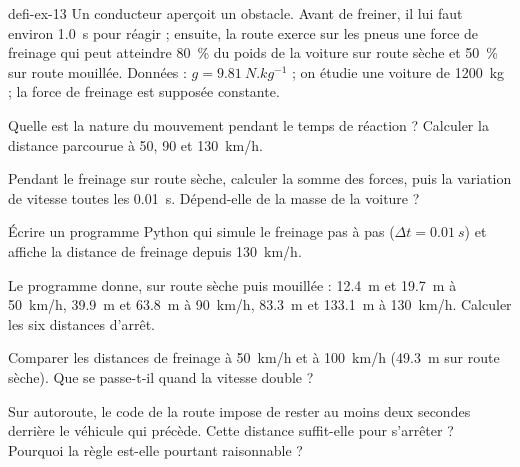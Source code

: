 \begin{blocEdition}{defi-ex-13}
Un conducteur aperçoit un obstacle. Avant de freiner, il lui faut environ \qty{1,0}{s} pour réagir ; ensuite, la route exerce sur les
pneus une force de freinage qui peut atteindre \qty{80}{\percent} du poids de la voiture sur route sèche et \qty{50}{\percent} sur route mouillée.
Données : $g=\qty{9,81}{N.kg^{-1}}$ ; on étudie une voiture de \qty{1200}{kg} ; la force de freinage est supposée constante.
\begin{questions}
\item Quelle est la nature du mouvement pendant le temps de réaction ? Calculer la distance parcourue à 50, 90 et \qty{130}{km/h}.
\item Pendant le freinage sur route sèche, calculer la somme des forces, puis la variation de vitesse toutes les \qty{0,01}{s}. Dépend-elle
de la masse de la voiture ?
\item Écrire un programme Python qui simule le freinage pas à pas ($\Delta t=\qty{0,01}{s}$) et affiche la distance de freinage depuis \qty{130}{km/h}.
\item Le programme donne, sur route sèche puis mouillée : \qty{12,4}{m} et \qty{19,7}{m} à \qty{50}{km/h}, \qty{39,9}{m} et \qty{63,8}{m} à \qty{90}{km/h},
\qty{83,3}{m} et \qty{133,1}{m} à \qty{130}{km/h}. Calculer les six distances d'arrêt.
\item Comparer les distances de freinage à \qty{50}{km/h} et à \qty{100}{km/h} (\qty{49,3}{m} sur route sèche). Que se passe-t-il quand la vitesse double ?
\item Sur autoroute, le code de la route impose de rester au moins deux secondes derrière le véhicule qui précède. Cette distance
suffit-elle pour s'arrêter ? Pourquoi la règle est-elle pourtant raisonnable ?
\end{questions}
\end{blocEdition}

